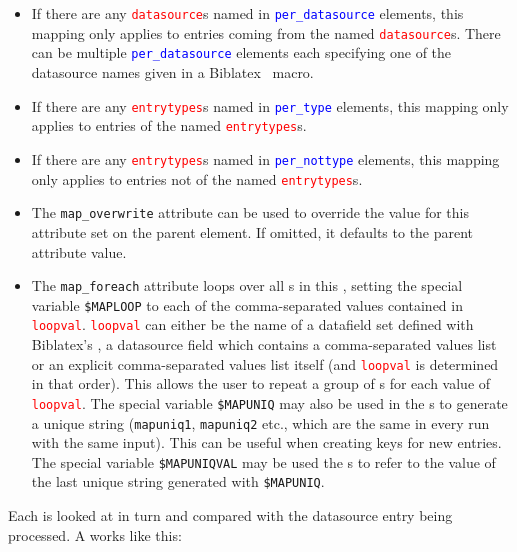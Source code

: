 \documentclass{ltxdockit}
\newcommand*{\biblatex}{Biblatex\xspace}
\begin{document}
\begin{itemize}
\item If there are any \textcolor{red}{\texttt{datasource}}s named in
  \textcolor{blue}{\texttt{per\_datasource}} elements, this mapping only applies to entries
  coming from the named \textcolor{red}{\texttt{datasource}}s. There can be
  multiple \textcolor{blue}{\texttt{per\_datasource}} elements each specifying one of the
  datasource names given in a \biblatex\ \verb++ macro.
\item If there are any \textcolor{red}{\texttt{entrytypes}}s named in
  \textcolor{blue}{\texttt{per\_type}} elements, this mapping only applies to entries
  of the named \textcolor{red}{\texttt{entrytypes}}s.
\item If there are any \textcolor{red}{\texttt{entrytypes}}s named in
  \textcolor{blue}{\texttt{per\_nottype}} elements, this mapping only applies to entries
  not of the named \textcolor{red}{\texttt{entrytypes}}s.
\item The \texttt{map\_overwrite} attribute can be used to override the
  value for this attribute set on the parent  element. If
  omitted, it defaults to the parent  attribute value.
\item The \texttt{map\_foreach} attribute loops over all s in
  this , setting the special variable \verb+$MAPLOOP+ to each of
  the comma-separated values contained in
  \textcolor{red}{\texttt{loopval}}. \textcolor{red}{\texttt{loopval}} can
  either be the name of a datafield set defined with \biblatex's
  , a datasource field which contains a
  comma-separated values list or an explicit comma-separated values list
  itself (and \textcolor{red}{\texttt{loopval}} is determined in that
  order). This allows the user to repeat a group of s for
  each value of \textcolor{red}{\texttt{loopval}}. The special variable
  \verb+$MAPUNIQ+ may also be used in the s to generate a
  unique string (\verb+mapuniq1+, \verb+mapuniq2+ etc., which are the same in
  every run with the same input). This can be useful when creating keys for new
  entries. The special variable \verb+$MAPUNIQVAL+ may be used the
  s to refer to the value of the last unique string
  generated with \verb+$MAPUNIQ+.
\end{itemize}

\noindent Each  is looked at in turn and compared with the
datasource entry being processed. A  works like this:
\end{document}
